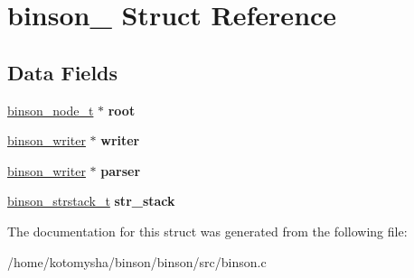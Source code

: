 \hypertarget{structbinson__}{\section{binson\-\_\- Struct Reference}
\label{structbinson__}
}
\subsection*{Data Fields}
\begin{DoxyCompactItemize}
\item 
\hypertarget{structbinson___a96ab841621194613078f723da426b8f2}{\hyperlink{struct__binson__node__t}{binson\-\_\-node\-\_\-t} $\ast$ {\bfseries root}}\label{structbinson___a96ab841621194613078f723da426b8f2}

\item 
\hypertarget{structbinson___a6e193880a3939e7303be22804f10441e}{\hyperlink{binson__writer_8c_a08ee70963c9d42673922089ac1850d74}{binson\-\_\-writer} $\ast$ {\bfseries writer}}\label{structbinson___a6e193880a3939e7303be22804f10441e}

\item 
\hypertarget{structbinson___a85b40d978b6d1749cfa8a7fa170d6ee7}{\hyperlink{binson__writer_8c_a08ee70963c9d42673922089ac1850d74}{binson\-\_\-writer} $\ast$ {\bfseries parser}}\label{structbinson___a85b40d978b6d1749cfa8a7fa170d6ee7}

\item 
\hypertarget{structbinson___a7dcc54b4a24fe500728a1190ca27d16e}{\hyperlink{struct__binson__strstack__t}{binson\-\_\-strstack\-\_\-t} {\bfseries str\-\_\-stack}}\label{structbinson___a7dcc54b4a24fe500728a1190ca27d16e}

\end{DoxyCompactItemize}


The documentation for this struct was generated from the following file\-:\begin{DoxyCompactItemize}
\item 
/home/kotomysha/binson/binson/src/binson.\-c\end{DoxyCompactItemize}
